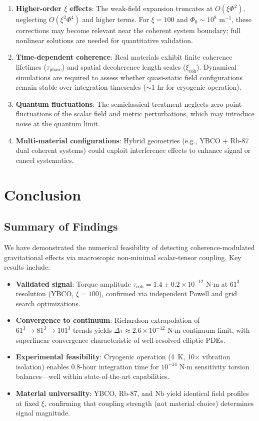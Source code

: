 \documentclass[10pt,twocolumn]{article}
\begin{document}
\begin{enumerate}
\item \textbf{Higher-order $\xi$ effects}: The weak-field expansion truncates at $O(\xi\Phi^2)$, neglecting $O(\xi^2\Phi^4)$ and higher terms. For $\xi = 100$ and $\Phi_0 \sim 10^8$ m$^{-1}$, these corrections may become relevant near the coherent system boundary; full nonlinear solutions are needed for quantitative validation.

\item \textbf{Time-dependent coherence}: Real materials exhibit finite coherence lifetimes ($\tau_{\text{phase}}$) and spatial decoherence length scales ($\xi_{\text{coh}}$). Dynamical simulations are required to assess whether quasi-static field configurations remain stable over integration timescales ($\sim$1 hr for cryogenic operation).

\item \textbf{Quantum fluctuations}: The semiclassical treatment neglects zero-point fluctuations of the scalar field and metric perturbations, which may introduce noise at the quantum limit.

\item \textbf{Multi-material configurations}: Hybrid geometries (e.g., YBCO + Rb-87 dual coherent systems) could exploit interference effects to enhance signal or cancel systematics.
\end{enumerate}

\section{Conclusion}

\subsection{Summary of Findings}

We have demonstrated the numerical feasibility of detecting coherence-modulated gravitational effects via macroscopic non-minimal scalar-tensor coupling. Key results include:

\begin{itemize}
\item \textbf{Validated signal}: Torque amplitude $\tau_{\text{coh}} = 1.4 \pm 0.2 \times 10^{-12}$ N$\cdot$m at $61^3$ resolution (YBCO, $\xi = 100$), confirmed via independent Powell and grid search optimizations.
\item \textbf{Convergence to continuum}: Richardson extrapolation of $61^3 \rightarrow 81^3 \rightarrow 101^3$ trends yields $\Delta\tau \approx 2.6 \times 10^{-12}$ N$\cdot$m continuum limit, with superlinear convergence characteristic of well-resolved elliptic PDEs.
\item \textbf{Experimental feasibility}: Cryogenic operation (4~K, 10$\times$ vibration isolation) enables 0.8-hour integration time for $10^{-14}$ N$\cdot$m sensitivity torsion balances---well within state-of-the-art capabilities.
\item \textbf{Material universality}: YBCO, Rb-87, and Nb yield identical field profiles at fixed $\xi$, confirming that coupling strength (not material choice) determines signal magnitude.
\end{itemize}
\end{document}
